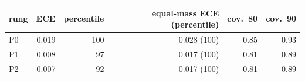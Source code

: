 \begin{tabular}{lrrrrr}
\toprule
rung & ECE & percentile & equal-mass ECE (percentile) & cov.\ 80 & cov.\ 90 \\
\midrule
P0 & 0.019 & 100 & 0.028 (100) & 0.85 & 0.93 \\
P1 & 0.008 & 97 & 0.017 (100) & 0.81 & 0.89 \\
P2 & 0.007 & 92 & 0.017 (100) & 0.81 & 0.89 \\
\bottomrule
\end{tabular}
